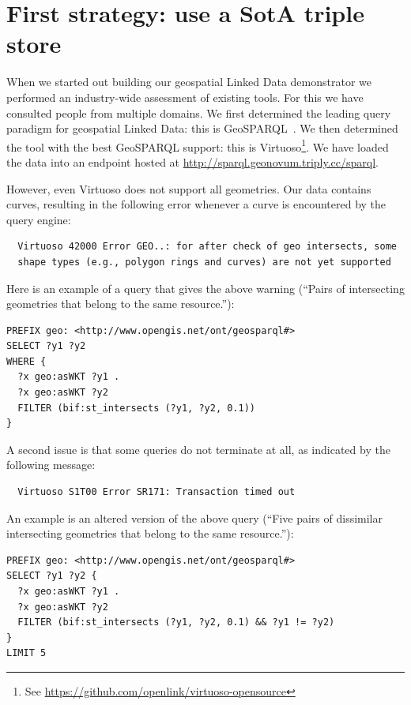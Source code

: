 \documentclass[a4paper]{scrartcl}
\begin{document}
\section{First strategy: use a SotA triple store}

When we started out building our geospatial Linked Data demonstrator
we performed an industry-wide assessment of existing tools.  For this
we have consulted people from multiple domains.  We first determined
the leading query paradigm for geospatial Linked Data: this is
GeoSPARQL~\cite{Battle2011}.  We then determined the tool with the
best GeoSPARQL support: this is Virtuoso\footnote{See
  \url{https://github.com/openlink/virtuoso-opensource}}.  We have
loaded the data into an endpoint hosted at
\url{http://sparql.geonovum.triply.cc/sparql}.

However, even Virtuoso does not support all geometries.  Our data
contains curves, resulting in the following error whenever a curve is
encountered by the query engine:

\begin{verbatim}
  Virtuoso 42000 Error GEO..: for after check of geo intersects, some
  shape types (e.g., polygon rings and curves) are not yet supported
\end{verbatim}

Here is an example of a query that gives the above warning (``Pairs of
intersecting geometries that belong to the same resource.''):

\begin{verbatim}
PREFIX geo: <http://www.opengis.net/ont/geosparql#>
SELECT ?y1 ?y2
WHERE {
  ?x geo:asWKT ?y1 .
  ?x geo:asWKT ?y2
  FILTER (bif:st_intersects (?y1, ?y2, 0.1))
}
\end{verbatim}

A second issue is that some queries do not terminate at all, as
indicated by the following message:

\begin{verbatim}
  Virtuoso S1T00 Error SR171: Transaction timed out
\end{verbatim}

An example is an altered version of the above query (``Five pairs of
dissimilar intersecting geometries that belong to the same
resource.''):

\begin{verbatim}
PREFIX geo: <http://www.opengis.net/ont/geosparql#>
SELECT ?y1 ?y2 {
  ?x geo:asWKT ?y1 .
  ?x geo:asWKT ?y2
  FILTER (bif:st_intersects (?y1, ?y2, 0.1) && ?y1 != ?y2)
}
LIMIT 5
\end{verbatim}
\end{document}
